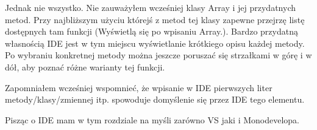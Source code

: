 \documentclass[10pt]{article}
\begin{document}
Jednak nie wszystko. Nie zauważyłem wcześniej klasy Array i jej przydatnych metod. Przy najbliższym użyciu którejś z metod tej klasy zapewne przejrzę listę dostępnych tam funkcji (Wyświetlą się po wpisaniu Array.). Bardzo przydatną własnością IDE jest w tym miejscu wyświetlanie krótkiego opisu każdej metody. Po wybraniu konkretnej metody można jeszcze poruszać się strzałkami w górę i w dół, aby poznać różne warianty tej funkcji.

Zapomniałem wcześniej wspomnieć, że wpisanie w IDE pierwszych liter metody/klasy/zmiennej itp. spowoduje domyślenie się przez IDE tego elementu.

Pisząc o IDE mam w tym rozdziale na myśli zarówno VS jaki i Monodevelopa.
\end{document}
